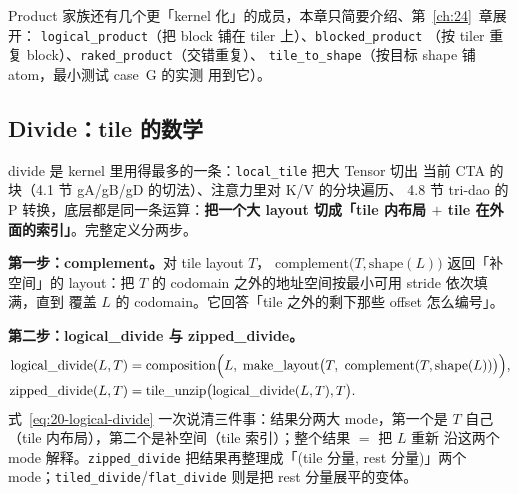 Product 家族还有几个更「kernel 化」的成员，本章只简要介绍、第~\ref{ch:24}~章展开：
\texttt{logical\_\allowbreak{}product}（把 block 铺在 tiler 上）、\texttt{blocked\_\allowbreak{}product}
（按 tiler 重复 block）、\texttt{raked\_\allowbreak{}product}（交错重复）、
\texttt{tile\_\allowbreak{}to\_\allowbreak{}shape}（按目标 shape 铺 atom，最小测试 case~G 的实测
用到它）。

\subsection{Divide：tile 的数学}

divide 是 kernel 里用得最多的一条：\texttt{local\_tile} 把大 Tensor 切出
当前 CTA 的块（4.1 节 gA/gB/gD 的切法）、注意力里对 K/V 的分块遍历、
4.8 节 tri-dao 的 P 转换，底层都是同一条运算：\textbf{把一个大 layout
切成「tile 内布局 $+$ tile 在外面的索引」}。完整定义分两步。

\textbf{第一步：complement。}对 tile layout $T$，
$\mathrm{complement}\bigl(T,\mathrm{shape}(L)\bigr)$ 返回「补空间」的
layout：把 $T$ 的 codomain 之外的地址空间按最小可用 stride 依次填满，直到
覆盖 $L$ 的 codomain。它回答「tile 之外的剩下那些 offset 怎么编号」。

\textbf{第二步：logical\_divide 与 zipped\_divide。}
\begin{align}
  \mathrm{logical\_divide}(L,T) &=
    \mathrm{composition}\Bigl(L,\;
      \mathrm{make\_layout}\bigl(T,\ \mathrm{complement}(T,\mathrm{shape}(L))\bigr)
    \Bigr), \label{eq:20-logical-divide} \\
  \mathrm{zipped\_divide}(L,T) &= \mathrm{tile\_unzip}\bigl(\mathrm{logical\_divide}(L,T),T\bigr).
    \label{eq:20-zipped-divide}
\end{align}
式~\eqref{eq:20-logical-divide} 一次说清三件事：结果分两大 mode，第一个是
$T$ 自己（tile 内布局），第二个是补空间（tile 索引）；整个结果 $=$ 把 $L$ 重新
沿这两个 mode 解释。\texttt{zipped\_\allowbreak{}divide} 把结果再整理成「(tile 分量,
rest 分量)」两个 mode；\texttt{tiled\_\allowbreak{}divide}/\texttt{flat\_divide}
则是把 rest 分量展平的变体。

